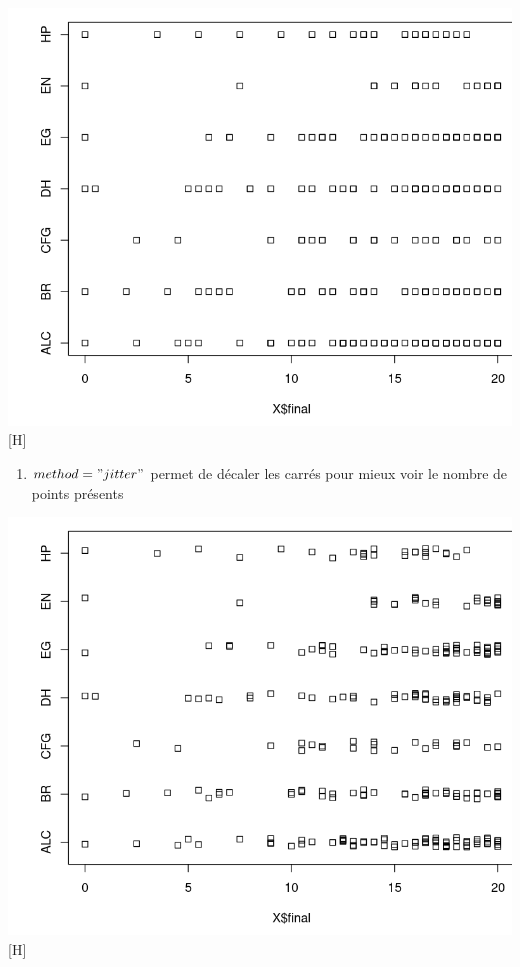 \documentclass[
]{article}
\newenvironment{Shaded}{}{}
\newcommand{\DataTypeTok}[1]{\textcolor[rgb]{0.56,0.13,0.00}{#1}}
\newcommand{\KeywordTok}[1]{\textcolor[rgb]{0.00,0.44,0.13}{\textbf{#1}}}
\newcommand{\NormalTok}[1]{#1}
\newcommand{\OperatorTok}[1]{\textcolor[rgb]{0.40,0.40,0.40}{#1}}
\newcommand{\StringTok}[1]{\textcolor[rgb]{0.25,0.44,0.63}{#1}}
\providecommand{\tightlist}{%
  \setlength{\itemsep}{0pt}\setlength{\parskip}{0pt}}
\begin{document}
\includegraphics{img/stripchart.png}[H]

\begin{enumerate}
\def\labelenumi{\arabic{enumi}.}
\setcounter{enumi}{32}
\tightlist
\item
  \(method = "jitter"\) permet de décaler les carrés pour mieux voir le
  nombre de points présents
\end{enumerate}

\begin{Shaded}
\end{Shaded}

\includegraphics{img/stripchart(jitter).png}[H]
\end{document}
